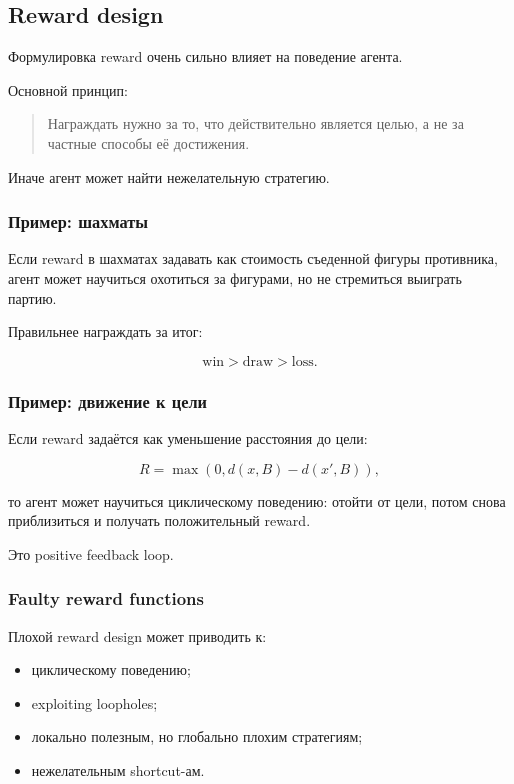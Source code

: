 \documentclass[a4paper,12pt]{article}
\begin{document}
\subsection{Reward design}

Формулировка reward очень сильно влияет на поведение агента.

Основной принцип:

\begin{quote}
Награждать нужно за то, что действительно является целью, а не за частные способы её достижения.
\end{quote}

Иначе агент может найти нежелательную стратегию.

\subsubsection{Пример: шахматы}

Если reward в шахматах задавать как стоимость съеденной фигуры противника, агент может научиться охотиться за фигурами, но не стремиться выиграть партию.

Правильнее награждать за итог:

\[
\text{win} > \text{draw} > \text{loss}.
\]

\subsubsection{Пример: движение к цели}

Если reward задаётся как уменьшение расстояния до цели:

\[
R = \max(0, d(x,B)-d(x',B)),
\]

то агент может научиться циклическому поведению: отойти от цели, потом снова приблизиться и получать положительный reward.

Это positive feedback loop.

\subsubsection{Faulty reward functions}

Плохой reward design может приводить к:

\begin{itemize}
    \item циклическому поведению;
    \item exploiting loopholes;
    \item локально полезным, но глобально плохим стратегиям;
    \item нежелательным shortcut-ам.
\end{itemize}
\end{document}
